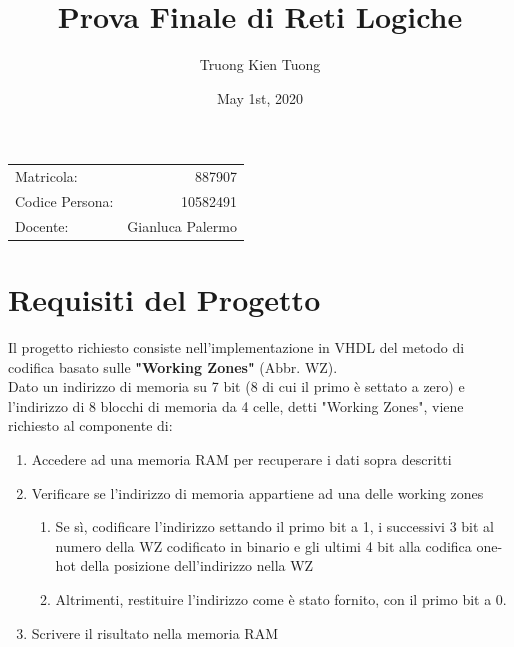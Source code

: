 \documentclass{article}
\title{Prova Finale di Reti Logiche} %
\author{Truong Kien Tuong} %
\date{May 1st, 2020}
\begin{document}
\maketitle %
\begin{center}
\begin{tabular}{l r}
Matricola: & 887907\\ %
Codice Persona: & 10582491\\
Docente: & Gianluca Palermo %
\end{tabular}
\end{center}



\section{Requisiti del Progetto}

Il progetto richiesto consiste nell'implementazione in VHDL del metodo di codifica basato sulle \textbf{"Working Zones"} (Abbr. WZ).\\
Dato un indirizzo di memoria su 7 bit (8 di cui il primo è settato a zero)
e l'indirizzo di 8 blocchi di memoria da 4 celle, detti "Working Zones",
viene richiesto al componente di:
\begin{enumerate}
\item Accedere ad una memoria RAM per recuperare i dati sopra descritti
\item Verificare se l'indirizzo di memoria appartiene ad una delle working zones
	\begin{enumerate}
	\item Se sì, codificare l'indirizzo settando il primo bit a 1, i successivi 3 bit al numero della WZ codificato in binario
	e gli ultimi 4 bit alla codifica one-hot della posizione dell'indirizzo nella WZ
	\item Altrimenti, restituire l'indirizzo come è stato fornito, con il primo bit a 0.
	\end{enumerate}
\item Scrivere il risultato nella memoria RAM
\end{enumerate}
\end{document}
